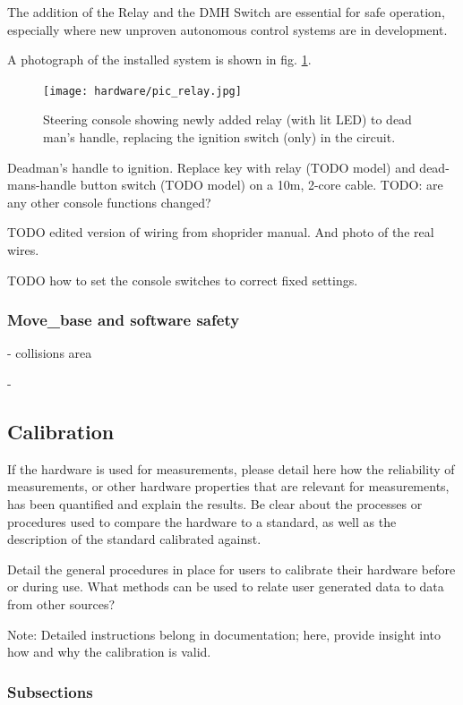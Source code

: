 \documentclass[a4paper]{article}
\begin{document}
The addition of the Relay and the DMH Switch are essential for safe operation, especially where new unproven autonomous control systems are in development.

A photograph of the installed system is shown in fig. \ref{fig:actuatorMounted}.

\begin{figure}[h]
	\texttt{[image: hardware/pic\_relay.jpg]}
	\caption{Steering console showing newly added relay (with lit LED) to dead man’s handle, replacing the ignition switch (only) in the circuit.}
	\label{fig:actuatorMounted}
\end{figure}

Deadman’s handle to ignition. Replace key with relay (TODO model) and dead-mans-handle button switch (TODO model) on a 10m, 2-core cable.    TODO: are any other console functions changed? 

TODO edited version of wiring from shoprider manual. And photo of the real wires.

TODO how to set the console switches to correct fixed settings.

\subsubsection{Move\_base and software safety}

- collisions area

- 




\subsection{Calibration}\label{h.kr90wh14sxr5}

If the hardware is used for measurements, please detail here how the
reliability of measurements, or other hardware properties that are
relevant for measurements, has been quantified and explain the
results. Be clear about the processes or procedures used to compare the
hardware to a standard, as well as the description of the standard
calibrated against.

Detail the general procedures in place for users to calibrate their
hardware before or during use. What methods can be used to relate user
generated data to data from other sources? 

Note: Detailed instructions belong in documentation; here, provide
insight into how and why the calibration is valid.


\subsubsection{Subsections}\label{h.6mrkl1u5j8xc}
\end{document}
